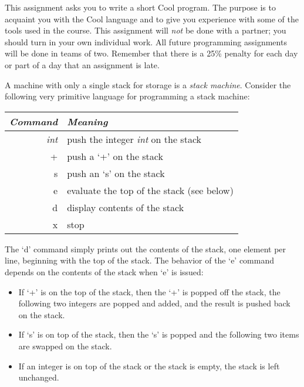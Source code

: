 %
%





This assignment asks you to write a short Cool program.  The purpose
is to acquaint you with the Cool language and to give you experience with some of
the tools used in the course.  This assignment will {\em not} be
done with a partner; you should turn in your own individual work.  All
future programming assignments will be done in teams of two.  Remember
that there is a 25\% penalty for each day or part of a day that an
assignment is late.

A machine with only a single stack for storage is a {\em stack machine}.
Consider the following very primitive language for programming  
a stack machine: \\
\begin{center}
\begin{tabular}{r|l}
{\em Command} & {\em Meaning} \\ \hline
{\em int}  & push the integer {\em int}  on the stack \\
+ & push a `+' on the stack \\
s & push an `s' on the stack \\
e & evaluate the top of the stack (see below) \\
d & display contents of the stack \\
x & stop
\end{tabular}
\end{center}

The `d' command simply prints out the contents of the stack, one element
per line, beginning with the top of the stack.
The behavior of the `e' command depends on the contents of the stack
when `e' is issued:
\begin{itemize}
\item If `+' is on the top of the stack, then the `+'
	is popped off the stack, the following two integers are popped and added, 	 and the result is pushed back on the stack.

\item If `s' is on top of the stack, then the `s' is popped and
	the following two items are swapped on the stack.

\item If an integer is on top of the stack or the stack is empty, the
	stack is left unchanged.
\end{itemize}

